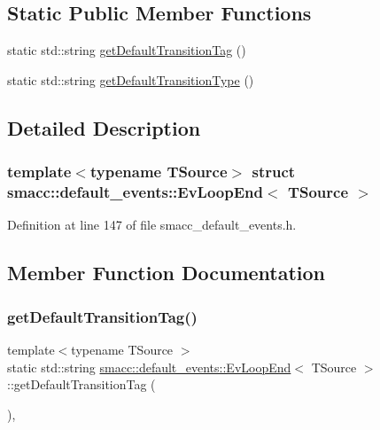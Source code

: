 \subsection*{Static Public Member Functions}
\begin{DoxyCompactItemize}
\item 
static std\+::string \hyperlink{structsmacc_1_1default__events_1_1EvLoopEnd_af7b3176144e2e2aa4ff11846f0896fa9}{get\+Default\+Transition\+Tag} ()
\item 
static std\+::string \hyperlink{structsmacc_1_1default__events_1_1EvLoopEnd_a9e05a6de331e6926fdcaa1ef13a6bd3c}{get\+Default\+Transition\+Type} ()
\end{DoxyCompactItemize}


\subsection{Detailed Description}
\subsubsection*{template$<$typename T\+Source$>$\newline
struct smacc\+::default\+\_\+events\+::\+Ev\+Loop\+End$<$ T\+Source $>$}



Definition at line 147 of file smacc\+\_\+default\+\_\+events.\+h.



\subsection{Member Function Documentation}
\mbox{\label{structsmacc_1_1default__events_1_1EvLoopEnd_af7b3176144e2e2aa4ff11846f0896fa9}} 
\subsubsection{\texorpdfstring{get\+Default\+Transition\+Tag()}{getDefaultTransitionTag()}}
{\footnotesize\ttfamily template$<$typename T\+Source $>$ \\
static std\+::string \hyperlink{structsmacc_1_1default__events_1_1EvLoopEnd}{smacc\+::default\+\_\+events\+::\+Ev\+Loop\+End}$<$ T\+Source $>$\+::get\+Default\+Transition\+Tag (\begin{DoxyParamCaption}{ }\end{DoxyParamCaption})\hspace{0.3cm}{\ttfamily [inline]}, {\ttfamily [static]}}



